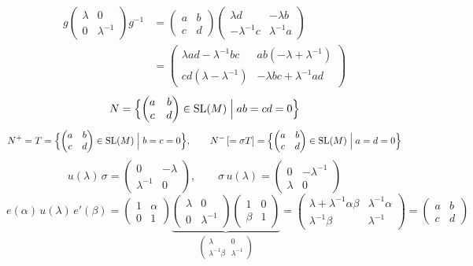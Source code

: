 \documentclass[11pt,a4paper]{article}
\begin{document}
\[
\begin{aligned}
g \begin{pmatrix} \lambda & 0 \\ 0 & \lambda^{-1} \end{pmatrix} g^{-1}
&= \begin{pmatrix} a & b \\ c & d \end{pmatrix} \begin{pmatrix} \lambda d & -\lambda b \\ -\lambda^{-1}c & \lambda^{-1}a \end{pmatrix} \\
&= \begin{pmatrix} \lambda ad - \lambda^{-1}bc & ab(-\lambda + \lambda^{-1}) \\ cd(\lambda - \lambda^{-1}) & -\lambda bc + \lambda^{-1}ad \end{pmatrix}
\end{aligned}
\]
\[
N = \Bigl\{ \begin{pmatrix} a & b \\ c & d \end{pmatrix} \in \mathrm{SL}(M) \Bigm| ab = cd = 0 \Bigr\}
\]
\[
N^+ = T = \Bigl\{ \begin{pmatrix} a & b \\ c & d \end{pmatrix} \in \mathrm{SL}(M) \Bigm| b = c = 0 \Bigr\}, \qquad
N^- \,[= \sigma T] = \Bigl\{ \begin{pmatrix} a & b \\ c & d \end{pmatrix} \in \mathrm{SL}(M) \Bigm| a = d = 0 \Bigr\}
\]
\[
u(\lambda)\,\sigma = \begin{pmatrix} 0 & -\lambda \\ \lambda^{-1} & 0 \end{pmatrix}, \qquad
\sigma\, u(\lambda) = \begin{pmatrix} 0 & -\lambda^{-1} \\ \lambda & 0 \end{pmatrix}
\]
\[
e(\alpha)\,u(\lambda)\,e'(\beta) = \begin{pmatrix} 1 & \alpha \\ 0 & 1 \end{pmatrix}
\underbrace{\begin{pmatrix} \lambda & 0 \\ 0 & \lambda^{-1} \end{pmatrix} \begin{pmatrix} 1 & 0 \\ \beta & 1 \end{pmatrix}}_{\begin{pmatrix} \lambda & 0 \\ \lambda^{-1}\beta & \lambda^{-1} \end{pmatrix}}
= \begin{pmatrix} \lambda + \lambda^{-1}\alpha\beta & \lambda^{-1}\alpha \\ \lambda^{-1}\beta & \lambda^{-1} \end{pmatrix}
= \begin{pmatrix} a & b \\ c & d \end{pmatrix}
\]
\end{document}
